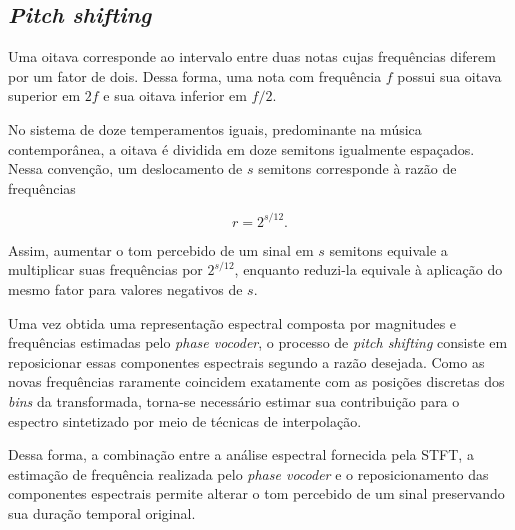 \subsection{\textit{Pitch shifting}}

Uma oitava corresponde ao intervalo entre duas notas cujas frequências diferem por um fator de dois. Dessa forma, uma nota com frequência \(f\) possui sua oitava superior em \(2f\) e sua oitava inferior em \(f/2\).

No sistema de doze temperamentos iguais, predominante na música contemporânea, a oitava é dividida em doze semitons igualmente espaçados. Nessa convenção, um deslocamento de \(s\) semitons corresponde à razão de frequências

\begin{equation}
r = 2^{s/12}.
\end{equation}

Assim, aumentar o tom percebido de um sinal em \(s\) semitons equivale a multiplicar suas frequências por \(2^{s/12}\), enquanto reduzi-la equivale à aplicação do mesmo fator para valores negativos de \(s\).

Uma vez obtida uma representação espectral composta por magnitudes e frequências estimadas pelo \textit{phase vocoder}, o processo de \textit{pitch shifting} consiste em reposicionar essas componentes espectrais segundo a razão desejada. Como as novas frequências raramente coincidem exatamente com as posições discretas dos \textit{bins} da transformada, torna-se necessário estimar sua contribuição para o espectro sintetizado por meio de técnicas de interpolação.

Dessa forma, a combinação entre a análise espectral fornecida pela STFT, a estimação de frequência realizada pelo \textit{phase vocoder} e o reposicionamento das componentes espectrais permite alterar o tom percebido de um sinal preservando sua duração temporal original.
